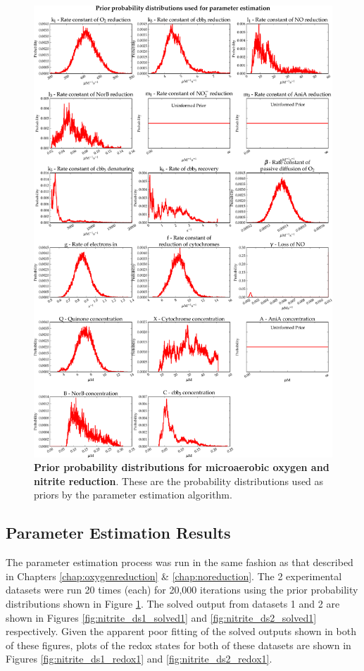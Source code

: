\begin{figure}[tbp]
 \centering
 \includegraphics[width=15cm, trim=0cm 0cm 0cm 0cm, clip=true]{./07-nitritereduction/data/priors1.pdf}
 \caption[Prior probability distributions for microaerobic oxygen and nitrite reduction]{{\bf Prior probability distributions for microaerobic oxygen and nitrite reduction}. These are the probability distributions used as priors by the parameter estimation algorithm.
 \label{fig:nitrite_priors1}}
\end{figure}
\afterpage{\clearpage}

\subsection{Parameter Estimation Results}
The parameter estimation process was run in the same fashion as that described in Chapters \ref{chap:oxygenreduction} \& \ref{chap:noreduction}. The 2 experimental datasets were run 20 times (each) for 20,000 iterations using the prior probability distributions shown in Figure \ref{fig:nitrite_priors1}. The solved output from datasets 1 and 2 are shown in Figures \ref{fig:nitrite_ds1_solved1} and \ref{fig:nitrite_ds2_solved1} respectively. Given the apparent poor fitting of the solved outputs shown in both of these figures, plots of the redox states for both of these datasets are shown in Figures \ref{fig:nitrite_ds1_redox1} and \ref{fig:nitrite_ds2_redox1}.

